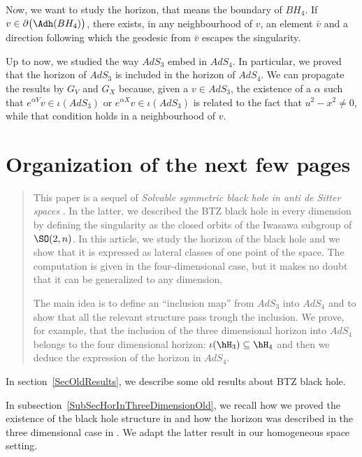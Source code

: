 Now, we want to study the horizon, that means the boundary of $BH_4$. If $v\in\partial\big(\Adh(BH_4) \big)$, there exists, in any neighbourhood of $v$, an element $\bar v$ and a direction following which the geodesic from $\bar v$ escapes the singularity.

Up to now, we studied the way $AdS_3$ embed in $AdS_4$. In particular, we proved that the horizon of $AdS_3$ is included in the horizon of $AdS_4$. We can propagate the results by $G_V$ and $G_X$ because, given a $v\in AdS_3$, the existence of a $\alpha$ such that $ e^{\alpha V}v\in\iota(AdS_3)$ or $ e^{\alpha X}v\in\iota(AdS_3)$ is related to the fact that $u^2-x^2\neq 0$, while that condition holds in a neighbourhood of $v$.

\section{Organization of the next few pages}

\begin{abstract}
	This paper is a sequel of \emph{Solvable symmetric black hole in anti de Sitter spaces} \cite{lcTNAdS}. In the latter, we described the BTZ black hole in every dimension by defining the singularity as the closed orbits of the Iwasawa subgroup of $\SO(2,n)$. In this article, we study the horizon of the black hole and we show that it is expressed as lateral classes of one point of the space. The computation is given in the four-dimensional case, but it makes no doubt that it can be generalized to any dimension.

	The main idea is to define an ``inclusion map'' from $AdS_3$ into $AdS_4$ and to show that all the relevant structure pass trough the inclusion. We prove, for example, that the inclusion of the three dimensional horizon into $AdS_4$ belongs to the four dimensional horizon: $\iota(\hH_3)\subseteq\hH_4$ and then we deduce the expression of the horizon in $AdS_4$.
\end{abstract}

In section~\ref{SecOldResults}, we describe some old results about BTZ black hole.

In subsection~\ref{SubSecHorInThreeDimensionOld}, we recall how we proved the existence of the black hole structure in \cite{lcTNAdS} and how the horizon was described in the three dimensional case in \cite{Keio}. We adapt the latter result in our homogeneous space setting.

